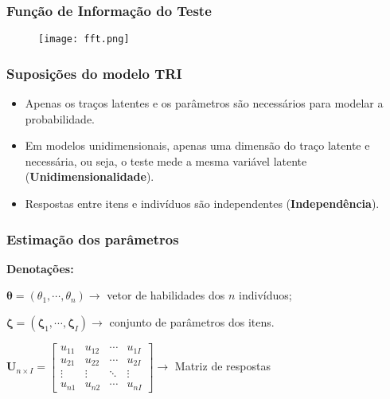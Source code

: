 \documentclass{beamer}
\begin{document}
	\begin{frame}
		
		\frametitle{Função de Informação do Teste}

		\begin{figure}
			\texttt{[image: fft.png]}
		\end{figure}
		
	
			
		
	\end{frame}
	
	\begin{frame}
		
		\frametitle{Suposições do modelo TRI}
	
		\begin{itemize}
			
			\item<1-> Apenas os traços latentes e os parâmetros são necessários para modelar a probabilidade.
						
			\item<1-> Em modelos unidimensionais, apenas uma dimensão do traço latente e necessária, ou seja, o teste mede a mesma variável latente (\textbf{Unidimensionalidade}).
			
			\item<1-> Respostas entre itens e indivíduos são independentes (\textbf{Independência}).
	
		\end{itemize}
		
	\end{frame}
	
	
    
    \begin{frame}
    	
    	\frametitle{Estimação dos parâmetros }
    	
    	\begin{center}
    		\textbf{Denotações:}
    	\end{center}
    	
    	$ \boldsymbol{\theta} = (\theta_1, \cdots, \theta_n) \rightarrow $  vetor de habilidades dos $n$ indivíduos; \newline
    	
    	$ \boldsymbol{\zeta} = (\boldsymbol{\zeta}_1, \cdots, \boldsymbol{\zeta}_I) \rightarrow $ conjunto de parâmetros dos itens.\newline
    	
    	$ \textbf{U}_{n\times I} =  
    	\begin{bmatrix}
    		u_{11} & u_{12} & \cdots & u_{1I} \\
    		u_{21} & u_{22} & \cdots & u_{2I} \\
    		\vdots & \vdots & \ddots & \vdots\\
    		u_{n1} & u_{n2} & \cdots & u_{nI}
    	\end{bmatrix} \rightarrow
    	$ Matriz de respostas
    	
    	
    	
    \end{frame}
    
\end{document}
